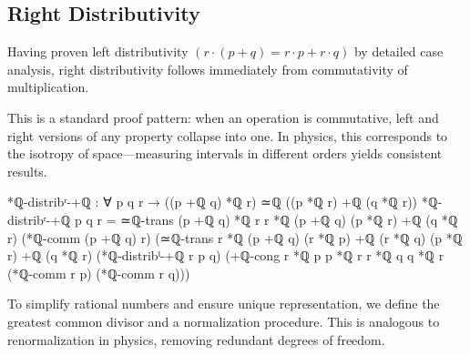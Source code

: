 \documentclass[11pt,a4paper]{book}
\begin{document}
\subsection{Right Distributivity}

Having proven left distributivity $(r \cdot (p + q) = r \cdot p + r \cdot q)$ by detailed case analysis, right distributivity follows immediately from commutativity of multiplication.

This is a standard proof pattern: when an operation is commutative, left and right versions of any property collapse into one.
In physics, this corresponds to the isotropy of space---measuring intervals in different orders yields consistent results.

\begin{code}
*ℚ-distribʳ-+ℚ : ∀ p q r → ((p +ℚ q) *ℚ r) ≃ℚ ((p *ℚ r) +ℚ (q *ℚ r))
*ℚ-distribʳ-+ℚ p q r = 
  ≃ℚ-trans {(p +ℚ q) *ℚ r} {r *ℚ (p +ℚ q)} {(p *ℚ r) +ℚ (q *ℚ r)}
    (*ℚ-comm (p +ℚ q) r)
    (≃ℚ-trans {r *ℚ (p +ℚ q)} {(r *ℚ p) +ℚ (r *ℚ q)} {(p *ℚ r) +ℚ (q *ℚ r)}
      (*ℚ-distribˡ-+ℚ r p q)
      (+ℚ-cong {r *ℚ p} {p *ℚ r} {r *ℚ q} {q *ℚ r} 
               (*ℚ-comm r p) (*ℚ-comm r q)))
\end{code}

To simplify rational numbers and ensure unique representation, we define the greatest common divisor and a normalization procedure. This is analogous to renormalization in physics, removing redundant degrees of freedom.
\end{document}

